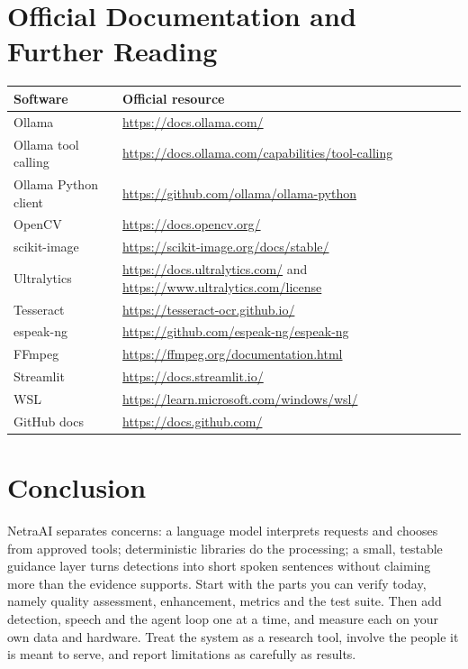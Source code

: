 \chapter{Official Documentation and Further Reading}
\begin{table}[ht]\centering\small
\begin{tabular}{@{}p{3.6cm}p{11cm}@{}}\toprule
\textbf{Software} & \textbf{Official resource}\\\midrule
Ollama & \url{https://docs.ollama.com/}\\
Ollama tool calling & \url{https://docs.ollama.com/capabilities/tool-calling}\\
Ollama Python client & \url{https://github.com/ollama/ollama-python}\\
OpenCV & \url{https://docs.opencv.org/}\\
scikit-image & \url{https://scikit-image.org/docs/stable/}\\
Ultralytics & \url{https://docs.ultralytics.com/} and \url{https://www.ultralytics.com/license}\\
Tesseract & \url{https://tesseract-ocr.github.io/}\\
espeak-ng & \url{https://github.com/espeak-ng/espeak-ng}\\
FFmpeg & \url{https://ffmpeg.org/documentation.html}\\
Streamlit & \url{https://docs.streamlit.io/}\\
WSL & \url{https://learn.microsoft.com/windows/wsl/}\\
GitHub docs & \url{https://docs.github.com/}\\
\bottomrule\end{tabular}
\end{table}

\chapter*{Conclusion}
NetraAI separates concerns: a language model interprets requests and chooses from approved tools; deterministic libraries do the processing; a small, testable guidance layer turns detections into short spoken sentences without claiming more than the evidence supports. Start with the parts you can verify today, namely quality assessment, enhancement, metrics and the test suite. Then add detection, speech and the agent loop one at a time, and measure each on your own data and hardware. Treat the system as a research tool, involve the people it is meant to serve, and report limitations as carefully as results.
